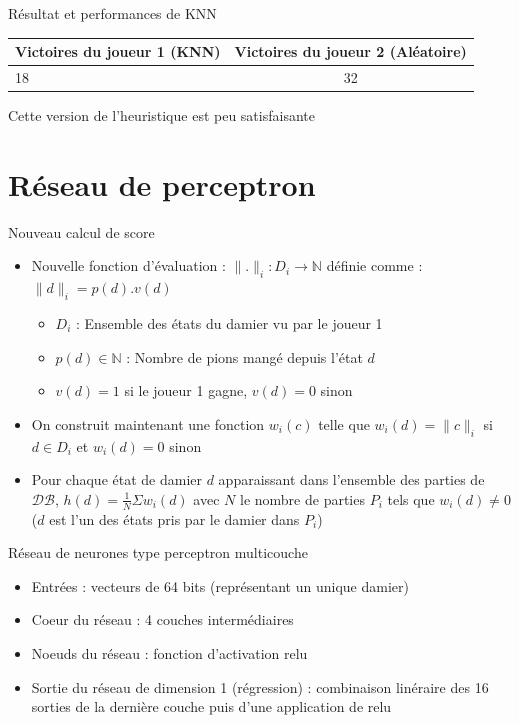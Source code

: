 \documentclass{beamer}
\begin{document}
\begin{frame}{Résultat et performances de KNN}
    \begin{center}
        \begin{tabular}{ | l | c | }
          \hline
          Victoires du joueur 1 (KNN) & Victoires du joueur 2 (Aléatoire)  \\ \hline
          18 & 32  \\ \hline
        \end{tabular}
      \end{center}

Cette version de l'heuristique est peu satisfaisante

\end{frame}

{\section{Réseau de perceptron}}

\begin{frame} {Nouveau calcul de score}
    \begin{itemize}
        \item Nouvelle fonction d'évaluation : \newline
        $\lVert.\rVert_i : D_i \to \mathbb{N}$ définie comme : $\lVert d \rVert_i = p(d).v(d)$
        \begin{itemize}
            \item $D_i$ : Ensemble des états du damier vu par le joueur 1
            \item $p(d) \in \mathbb{N}$ : Nombre de pions mangé depuis l'état $d$
            \item  $v(d) = 1$ si le joueur 1 gagne, $v(d) = 0$ sinon
        \end{itemize}
        \item On construit maintenant une fonction $w_i(c)$ telle que $w_i(d) = \lVert c \lVert_i$ si $d \in D_i$ et $w_i(d) = 0$ sinon
        \item Pour chaque état de damier $d$ apparaissant dans l'ensemble des parties de $\mathcal{DB}$, $h(d) = \frac{1}{N}\Sigma w_i(d)$ avec $N$ le nombre de parties $P_i$ tels que $w_i(d) \neq 0$ ($d$ est l'un des états pris par le damier dans $P_i$)
         
    \end{itemize}
\end{frame}

\begin{frame} {Réseau de neurones type perceptron multicouche}
    \begin{itemize}
        \item Entrées : vecteurs de 64 bits (représentant un unique damier)
        \item Coeur du réseau : 4 couches intermédiaires
        \item Noeuds du réseau : fonction d'activation \alert{relu}
        \item Sortie du réseau de dimension 1 (régression) : combinaison linéraire des 16 sorties de la dernière couche puis d'une application de \alert{relu}
    \end{itemize}
\end{frame}
\end{document}
